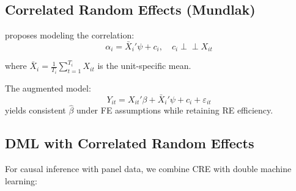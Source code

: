 \subsection{Correlated Random Effects (Mundlak)}

\textcite{mundlak1978pooling} proposes modeling the correlation:
\begin{equation}
\alpha_i = \bar{X}_i'\psi + c_i, \quad c_i \perp\!\!\!\perp X_{it}
\end{equation}

where $\bar{X}_i = \frac{1}{T_i}\sum_{t=1}^{T_i} X_{it}$ is the unit-specific mean.

\begin{proposition}
The augmented model:
\begin{equation}
Y_{it} = X_{it}'\beta + \bar{X}_i'\psi + c_i + \varepsilon_{it}
\end{equation}
yields consistent $\hat{\beta}$ under FE assumptions while retaining RE efficiency.
\end{proposition}

\subsection{DML with Correlated Random Effects}

For causal inference with panel data, we combine CRE with double machine learning:

